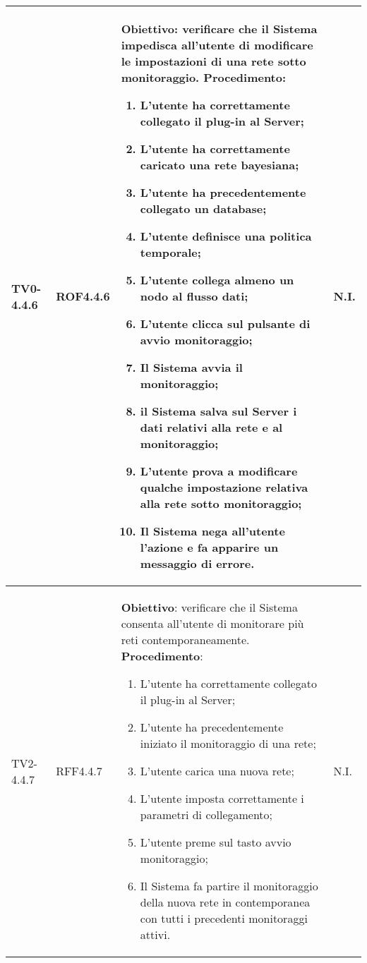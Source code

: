 \begin{longtable}{|C{.15\textwidth}|C{.13\textwidth}|m{.52\textwidth}|C{.08\textwidth}|}
TV0-4.4.6 & ROF4.4.6 &
	\textbf{Obiettivo}: verificare che il Sistema impedisca all'utente di modificare le impostazioni di una rete sotto monitoraggio. \newline
	\textbf{Procedimento}:
	\begin{enumerate}
		\item L'utente ha correttamente collegato il plug-in al Server;
		\item L'utente ha correttamente caricato una rete bayesiana;
		\item L'utente ha precedentemente collegato un database;
		\item L'utente definisce una politica temporale;
		\item L'utente collega almeno un nodo al flusso dati;
		\item L'utente clicca sul pulsante di avvio monitoraggio;							\item Il Sistema avvia il monitoraggio;
		\item il Sistema salva sul Server i dati relativi alla rete e al monitoraggio;
 		\item L'utente prova a modificare qualche impostazione relativa alla rete sotto monitoraggio;
 		\item Il Sistema nega all'utente l'azione e fa apparire un messaggio di errore.
	\end{enumerate}
	& N.I. \\
\hline

TV2-4.4.7 & RFF4.4.7 &
	\textbf{Obiettivo}: verificare che il Sistema consenta all'utente di monitorare più reti contemporaneamente. \newline
	\textbf{Procedimento}:
	\begin{enumerate}
		\item L'utente ha correttamente collegato il plug-in al Server;
		\item L'utente ha precedentemente iniziato il monitoraggio di una rete;
		\item L'utente carica una nuova rete;
		\item L'utente imposta correttamente i parametri di collegamento;
		\item L'utente preme sul tasto avvio monitoraggio;
		\item Il Sistema fa partire il monitoraggio della nuova rete in contemporanea con tutti i precedenti monitoraggi attivi.
	\end{enumerate}
	& N.I. \\
\hline


\end{longtable}

